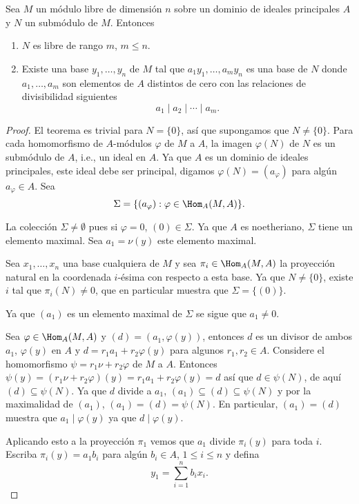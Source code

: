 \begin{theorem}
  Sea $M$ un módulo libre de dimensión $n$ sobre un dominio de ideales principales $A$ y $N$ un submódulo de $M$. Entonces
  \begin{enumerate}
    \item $N$ es libre de rango $m$, $m \leq n$.
    \item Existe una base $y_1,\ldots,y_n$ de $M$ tal que $a_1y_1,\ldots,a_m y_n$ es una base de $N$ donde $a_1,\ldots,a_m$ son elementos de $A$ distintos de cero con las relaciones de divisibilidad siguientes
      \[
        a_1 \mid a_2 \mid \cdots \mid a_m.
      \]
  \end{enumerate}
\end{theorem}
\begin{proof}
  El teorema es trivial para $N = \{0\}$, así que supongamos que $N \neq \{0\}$. Para cada homomorfismo de $A$-módulos $\varphi$ de $M$ a $A$, la imagen $\varphi(N)$ de $N$ es un submódulo de $A$, i.e., un ideal en $A$. Ya que $A$ es un dominio de ideales principales, este ideal debe ser principal, digamos $\varphi(N) = (a_\varphi)$ para algún $a_\varphi \in A$. Sea
  \[
    \Sigma = \{ (a_\varphi) : \varphi \in \Hom_A(M,A) \}.
  \]

  La colección $\Sigma \neq \emptyset$ pues si $\varphi = 0$, $(0) \in \Sigma$. Ya que $A$ es noetheriano, $\Sigma$ tiene un elemento maximal. Sea $a_1 = \nu(y)$ este elemento maximal.

  Sea $x_1,\ldots,x_n$ una base cualquiera de $M$ y sea $\pi_i \in \Hom_A(M,A)$ la proyección natural en la coordenada $i$-ésima con respecto a esta base. Ya que $N \neq \{0\}$, existe $i$ tal que $\pi_i(N) \neq 0$, que en particular muestra que $\Sigma = \{ (0)\}$.

  Ya que $(a_1)$ es un elemento maximal de $\Sigma$ se sigue que $a_1 \neq 0$.

  Sea $\varphi \in \Hom_A(M,A)$ y $(d) = (a_1, \varphi(y))$, entonces $d$ es un divisor de ambos $a_1$, $\varphi(y)$ en $A$ y $d = r_1 a_1 + r_2 \varphi(y)$ para algunos $r_1, r_2 \in A$. Considere el homomorfismo $\psi = r_1 \nu + r_2 \varphi$ de $M$ a $A$. Entonces $\psi(y) = (r_1 \nu + r_2 \varphi)(y) = r_1a_1 + r_2 \varphi(y) = d$ así que $d \in \psi(N)$, de aquí $(d) \subseteq \psi(N)$. Ya que $d$ divide a $a_1$, $(a_1) \subseteq (d) \subseteq \psi(N)$ y por la maximalidad de $(a_1)$, $(a_1) = (d) = \psi(N)$. En particular, $(a_1) = (d)$ muestra que $a_1 \mid \varphi(y)$ ya que $d \mid \varphi(y)$.

  Aplicando esto a la proyección $\pi_1$ vemos que $a_1$ divide $\pi_i(y)$ para toda $i$. Escriba $\pi_i(y) = a_1 b_i$ para algún $b_i \in A$, $1 \leq i \leq n$ y defina
  \[
    y_1 = \sum_{i=1}^n b_i x_i.
  \]


\end{proof}
